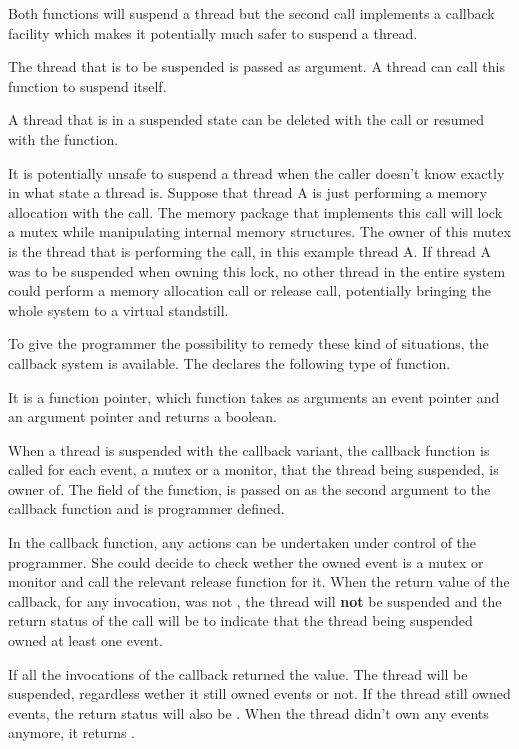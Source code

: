 Both functions will suspend a thread but the second call implements a
callback facility which makes it potentially much safer to suspend a thread.

The thread that is to be suspended is passed as  argument. A
thread can call this function to suspend itself.

A thread that is in a suspended state can be deleted with the
 call or resumed with the
 function.

It is potentially unsafe to suspend a thread when the caller doesn't know
exactly in what state a thread is. Suppose that thread A is just performing
a memory allocation with the  call. The memory package
that implements this call will lock a mutex while manipulating internal
memory structures. The owner of this mutex is the thread that is performing
the call, in this example thread A. If thread A was to be suspended when
owning this lock, no other thread in the entire system could perform a
memory allocation call or release call, potentially bringing the whole
system to a virtual standstill.

To give the programmer the possibility to remedy these kind of situations,
the callback system is available. The  declares the following
type of function.


It is a function pointer, which function takes as arguments an event pointer
and an argument pointer and returns a boolean.

When a thread is suspended with the callback variant, the callback function
is called for each event, a mutex or a monitor, that the thread being
suspended, is owner of. The  field of the
 function, is passed on as the second argument
to the callback function and is programmer defined.

In the callback function, any actions can be undertaken under control of the
programmer. She could decide to check wether the owned event is a mutex or
monitor and call the relevant release function for it. When the return value
of the callback, for any invocation, was not , the
thread will \textbf{not} be suspended and the return status of the
 call will be  to indicate
that the thread being suspended owned at least one event.

If all the invocations of the callback returned the  value.
The thread will be suspended, regardless wether it still owned events or
not. If the thread still owned events, the return status will also be
. When the thread didn't own any events anymore, it
returns .

